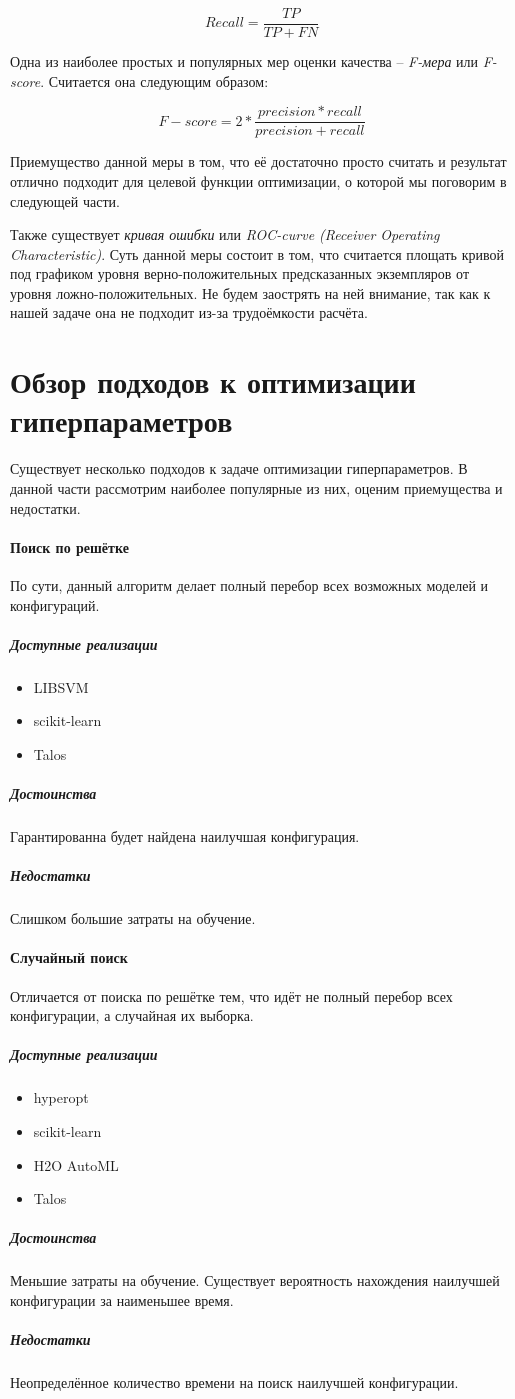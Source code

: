 \documentclass[times,specification,annotation]{itmo-student-thesis}
\begin{document}
	\begin{equation}
	Recall =  \frac{TP}{TP+FN}
	\label{eq:recall}
	\end{equation}
	
	Одна из наиболее простых и популярных мер оценки качества -- \textit{F-мера} или \textit{F-score}. Считается она следующим образом:
	
	\begin{equation}
 	\mathit{F-score} =  2 * \frac{precision*recall}{precision+recall} 
 	\label{eq:fscore}
	\end{equation}
		
	Приемущество данной меры в том, что её достаточно просто считать и результат отлично подходит для целевой функции оптимизации, о которой мы поговорим в следующей части.\par
	
	Также существует \textit{кривая ошибки} или \textit{ROC-curve (Receiver Operating Characteristic)}. Суть данной меры состоит в том, что считается площать кривой под графиком уровня верно-положительных предсказанных экземпляров от уровня ложно-положительных. Не будем заострять на ней внимание, так как к нашей задаче она не подходит из-за трудоёмкости расчёта. 
	
	
	\section{Обзор подходов к оптимизации гиперпараметров}
	Существует несколько подходов к задаче оптимизации гиперпараметров. В данной части рассмотрим наиболее популярные из них, оценим приемущества и недостатки.
	\paragraph{Поиск по решётке} По сути, данный алгоритм делает полный перебор всех возможных моделей и конфигураций.
		\subparagraph{Доступные реализации}
		\begin{itemize}
			\item LIBSVM
			\item scikit-learn
			\item Talos
		\end{itemize}
		\subparagraph{Достоинства} Гарантированна будет найдена наилучшая конфигурация.
		\subparagraph{Недостатки} Слишком большие затраты на обучение.
	\paragraph{Случайный поиск} Отличается от поиска по решётке тем, что идёт не полный перебор всех конфигурации, а случайная их выборка.
		\subparagraph{Доступные реализации}
		\begin{itemize}
			\item hyperopt
			\item scikit-learn
			\item H2O AutoML
			\item Talos
		\end{itemize}
		\subparagraph{Достоинства} Меньшие затраты на обучение. Существует вероятность нахождения наилучшей конфигурации за наименьшее время.
		\subparagraph{Недостатки} Неопределённое количество времени на поиск наилучшей конфигурации.
\end{document}
